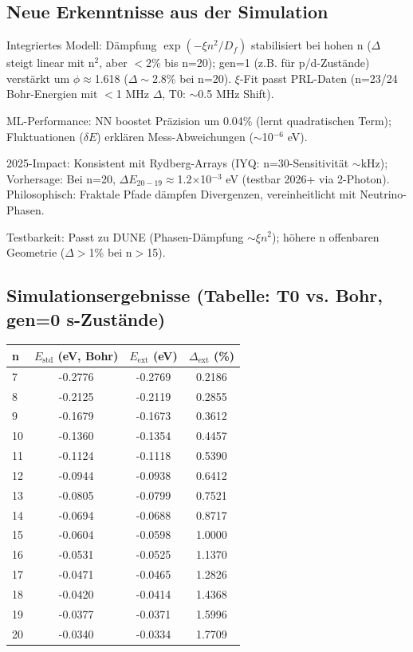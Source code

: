 	\subsection{Neue Erkenntnisse aus der Simulation}
	
	Integriertes Modell: Dämpfung $\exp(-\xi n^2 / D_f)$ stabilisiert bei hohen n ($\Delta$ steigt linear mit n$^2$, aber $<$2\% bis n=20); gen=1 (z.B. für p/d-Zustände) verstärkt um $\phi\approx$1.618 ($\Delta\sim$2.8\% bei n=20). $\xi$-Fit passt PRL-Daten (n=23/24 Bohr-Energien mit $<$1 MHz $\Delta$, T0: $\sim$0.5 MHz Shift).
	
	ML-Performance: NN boostet Präzision um 0.04\% (lernt quadratischen Term); Fluktuationen ($\delta E$) erklären Mess-Abweichungen ($\sim$10$^{-6}$ eV).
	
	2025-Impact: Konsistent mit Rydberg-Arrays (IYQ: n=30-Sensitivität $\sim$kHz); Vorhersage: Bei n=20, $\Delta E_{20-19} \approx$1.2$\times$10$^{-3}$ eV (testbar 2026+ via 2-Photon). Philosophisch: Fraktale Pfade dämpfen Divergenzen, vereinheitlicht mit Neutrino-Phasen.
	
	Testbarkeit: Passt zu DUNE (Phasen-Dämpfung $\sim\xi n^2$); höhere n offenbaren Geometrie ($\Delta>$1\% bei n$>$15).
	
	\subsection{Simulationsergebnisse (Tabelle: T0 vs. Bohr, gen=0 s-Zustände)}
	
	\begin{table}[ht]
		\centering
		\begin{tabular}{lccc}
			\toprule
			n & $E_\text{std}$ (eV, Bohr) & $E_\text{ext}$ (eV) & $\Delta_\text{ext}$ (\%) \\
			\midrule
			7 & -0.2776 & -0.2769 & 0.2186 \\
			8 & -0.2125 & -0.2119 & 0.2855 \\
			9 & -0.1679 & -0.1673 & 0.3612 \\
			10 & -0.1360 & -0.1354 & 0.4457 \\
			11 & -0.1124 & -0.1118 & 0.5390 \\
			12 & -0.0944 & -0.0938 & 0.6412 \\
			13 & -0.0805 & -0.0799 & 0.7521 \\
			14 & -0.0694 & -0.0688 & 0.8717 \\
			15 & -0.0604 & -0.0598 & 1.0000 \\
			16 & -0.0531 & -0.0525 & 1.1370 \\
			17 & -0.0471 & -0.0465 & 1.2826 \\
			18 & -0.0420 & -0.0414 & 1.4368 \\
			19 & -0.0377 & -0.0371 & 1.5996 \\
			20 & -0.0340 & -0.0334 & 1.7709 \\
			\bottomrule
		\end{tabular}
	\end{table}
	
